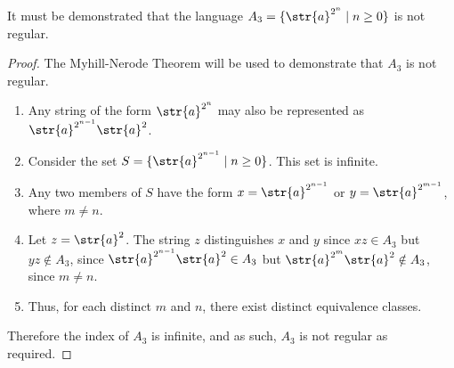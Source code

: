 It must be demonstrated that the language $A_3 = \{ \str{a}^{2^n} \mid n \geq 0 \}$ is not regular.
\begin{proof}
The Myhill-Nerode Theorem will be used to demonstrate that $A_3$ is not regular.
	\begin{enumerate}[label=\Roman*.]
		\item Any string of the form $\str{a}^{2^n}$ may also be represented as $\str{a}^{2^{n-1}}\str{a}^2$.
		\item Consider the set $S = \{ \str{a}^{2^{n-1}} \mid n \geq 0 \}$. This set is infinite.
		\item Any two members of $S$ have the form $x = \str{a}^{2^{n-1}}$ or $y = \str{a}^{2^{m-1}}$, where $m \neq n$.
		\item Let $z = \str{a}^2$. The string $z$ distinguishes $x$ and $y$ since $xz \in A_3$ but $yz \notin A_3$, since $\str{a}^{2^{n-1}}\str{a}^2 \in A_3$ but $\str{a}^{2^{m}}\str{a}^2 \notin A_3$, since $m \neq n$.
		\item Thus, for each distinct $m$ and $n$, there exist distinct equivalence classes.
	\end{enumerate}
	Therefore the index of $A_3$ is infinite, and as such, $A_3$ is not regular as required.
\end{proof}